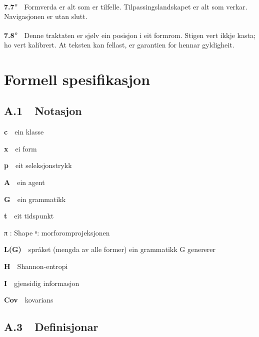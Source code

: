 \documentclass[10pt]{article}
\begin{document}
\noindent\textbf{7.7}\textsuperscript{\textit{o}}~~Formverda er alt som er tilfelle. Tilpassingslandskapet er alt som verkar. Navigasjonen er utan slutt.




\noindent\textbf{7.8}\textsuperscript{\textit{o}}~~Denne traktaten er sjølv ein posisjon i eit formrom. Stigen vert ikkje kasta; ho vert kalibrert. At teksten kan fellast, er garantien for hennar gyldigheit.


\appendix
\chapter*{Formell spesifikasjon}


\section*{A.1~~Notasjon}





\noindent\textbf{c}~~ein klasse




\noindent\textbf{x}~~ei form




\noindent\textbf{p}~~eit seleksjonstrykk




\noindent\textbf{A}~~ein agent




\noindent\textbf{G}~~ein grammatikk




\noindent\textbf{t}~~eit tidspunkt


π : Shape  ⁿ: morforomprojeksjonen


\noindent\textbf{L(G)}~~språket (mengda av alle former) ein grammatikk G genererer




\noindent\textbf{H}~~Shannon-entropi




\noindent\textbf{I}~~gjensidig informasjon




\noindent\textbf{Cov}~~kovarians




\section*{A.3~~Definisjonar}
\end{document}
